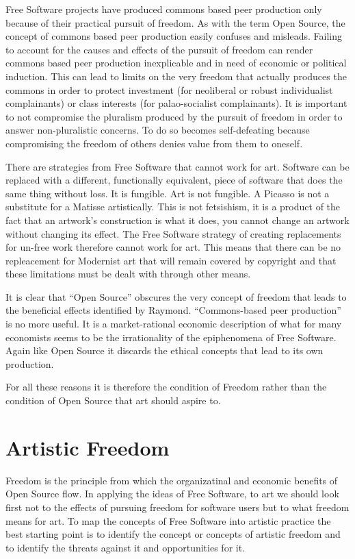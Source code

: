 \documentclass[11pt, a4]{article}
\begin{document}
Free Software projects have produced commons based peer production only because of their practical pursuit of freedom. As with the term Open Source, the concept of commons based peer production easily confuses and misleads. Failing to account for the causes and effects of the pursuit of freedom can render commons based peer production inexplicable and in need of economic or political induction. This can lead to limits on the very freedom that actually produces the commons in order to protect investment (for neoliberal or robust individualist complainants) or class interests (for palao-socialist complainants). It is important to not compromise the pluralism produced by the pursuit of freedom in order to answer non-pluralistic concerns. To do so becomes self-defeating because compromising the freedom of others denies value from them to oneself.

There are strategies from Free Software that cannot work for art. Software can be replaced with a different, functionally equivalent, piece of software that does the same thing without loss. It is fungible. Art is not fungible. A Picasso is not a substitute for a Matisse artistically. This is not fetsishism, it is a product of the fact that an artwork's construction is what it does, you cannot change an artwork without changing its effect. The Free Software strategy of creating replacements for un-free work therefore cannot work for art. This means that there can be no repleacement for Modernist art that will remain covered by copyright and that these limitations must be dealt with through other means.

It is clear that ``Open Source'' obscures the very concept of freedom that leads to the beneficial effects identified by Raymond. ``Commons-based peer production'' is no more useful. It is a market-rational economic description of what for many economists seems to be the irrationality of the epiphenomena of Free Software. Again like Open Source it discards the ethical concepts that lead to its own production.

For all these reasons it is therefore the condition of Freedom rather than the condition of Open Source that art should aspire to.


\section{Artistic Freedom}

Freedom is the principle from which the organizatinal and economic benefits of Open Source flow. In applying the ideas of Free Software, to art we should look first not to the effects of pursuing freedom for software users but to what freedom means for art. To map the concepts of Free Software into artistic practice the best starting point is to identify the concept or concepts of artistic freedom and to identify the threats against it and opportunities for it.
\end{document}
